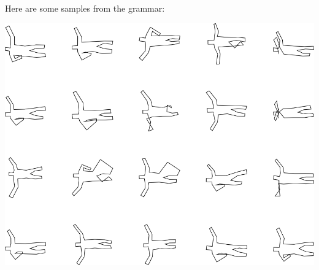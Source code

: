 Here are some samples from the grammar:

\includegraphics[width=6in]{output/3.learning/incremental/gram.29.d/samples.png}

